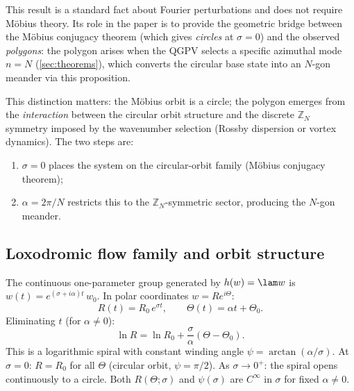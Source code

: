 \begin{remark}
This result is a standard fact about Fourier perturbations and does not
require M\"obius theory.  Its role in the paper is to provide the
geometric bridge between the M\"obius conjugacy theorem (which gives
\emph{circles} at $\sigma = 0$) and the observed \emph{polygons}: the
polygon arises when the QGPV selects a specific azimuthal mode $n = N$
(\cref{sec:theorems}), which converts the circular base state into an
$N$-gon meander via this proposition.
\end{remark}

This distinction matters: the M\"obius orbit is a circle; the polygon
emerges from the \emph{interaction} between the circular orbit structure
and the discrete $\mathbb{Z}_N$ symmetry imposed by the wavenumber
selection (Rossby dispersion or vortex dynamics).  The two steps are:
\begin{enumerate}
  \item $\sigma = 0$ places the system on the circular-orbit family
    (M\"obius conjugacy theorem);
  \item $\alpha = 2\pi/N$ restricts this to the $\mathbb{Z}_N$-symmetric
    sector, producing the $N$-gon meander.
\end{enumerate}

\subsection{Loxodromic flow family and orbit structure}

The continuous one-parameter group generated by $h(w) = \lam w$ is
$w(t) = e^{(\sigma + i\alpha)t}\,w_0$.  In polar coordinates
$w = Re^{i\Theta}$:
\begin{equation}\label{eq:orbit-polar}
  R(t) = R_0\,e^{\sigma t}, \qquad \Theta(t) = \alpha t + \Theta_0.
\end{equation}
Eliminating $t$ (for $\alpha \neq 0$):
\begin{equation}\label{eq:spiral-equation}
  \ln R = \ln R_0 + \frac{\sigma}{\alpha}(\Theta - \Theta_0).
\end{equation}
This is a logarithmic spiral with constant winding angle
$\psi = \arctan(\alpha/\sigma)$.  At $\sigma = 0$: $R = R_0$ for all
$\Theta$ (circular orbit, $\psi = \pi/2$).  As $\sigma \to 0^+$: the
spiral opens continuously to a circle.  Both $R(\Theta; \sigma)$ and
$\psi(\sigma)$ are $C^\infty$ in $\sigma$ for fixed $\alpha \neq 0$.

